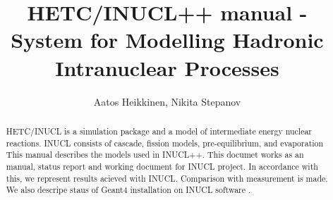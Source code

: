 \def \AATOS {/home/miheikki/public/html/}
\def \PIC {/afs/cern.ch/user/m/miheikki/public/html/inucl/doc/}
\def \PIC {/home/miheikki/public/html/inucl/doc/}
\newcommand{\ttbs}{\char'134}
\newcommand{\AmS}{{\protect\the\textfont2
  A\kern-.1667em\lower.5ex\hbox{M}\kern-.125emS}}


\title{HETC/INUCL++ manual - System for Modelling Hadronic Intranuclear Processes}

\author{Aatos Heikkinen, Nikita Stepanov 
\address{ Helsinki Institute of Physics,
P.O.Box 9,\\
FIN-00014 University of Helsinki, Finland }
	}
  


\begin{abstract}
HETC/INUCL is a simulation package and a model of intermediate energy nuclear
reactions.
INUCL consists of cascade, fission models, pre-equilibrium, and evaporation
This manual describes the models used in INUCL++. 
This documet works as an manual, status report and working document for INUCL project. In accordance with this, we represent results acieved with INUCL. Comparison with measurement is made. 
We also descripe staus of Geant4 installation on INUCL software \cite{titarenko99a}.
\end{abstract}
\maketitle

%






